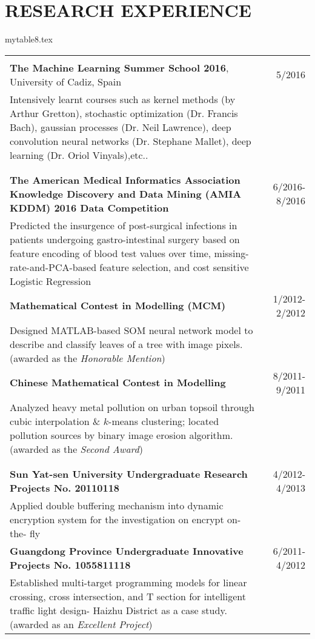 \documentclass[10pt,letterpaper]{article}
\begin{document}
\section*{RESEARCH EXPERIENCE}
\begin{filecontents}{mytable8.tex}
\begin{longtable}{Xr}
\noindent{\it Professional Training}\\
{\bf The Machine Learning Summer School 2016}, University of Cadiz, Spain& 5/2016\\
Intensively learnt courses such as kernel methods (by Arthur Gretton), stochastic optimization (Dr. Francis Bach), gaussian processes (Dr. Neil Lawrence), deep convolution neural networks (Dr. Stephane Mallet), deep learning (Dr. Oriol Vinyals),etc..\\
&\\
\noindent{\it Competitions}\\
\textbf{The American Medical Informatics Association Knowledge Discovery and Data Mining (AMIA KDDM) 2016 Data Competition}&6/2016-8/2016\\
Predicted the insurgence of post-surgical infections in patients undergoing gastro-intestinal surgery based on feature encoding of blood test values over time, missing-rate-and-PCA-based feature selection, and cost sensitive Logistic Regression&\\
\textbf{Mathematical Contest in Modelling (MCM) }& 1/2012-2/2012\\
Designed MATLAB-based SOM neural network model to describe and classify leaves of a tree with image pixels. (awarded as the {\it Honorable Mention})&\\
\textbf{Chinese Mathematical Contest in Modelling}& 8/2011-9/2011\\
Analyzed heavy metal pollution on urban topsoil through cubic interpolation \& $k$-means clustering; located pollution sources by binary image erosion algorithm. (awarded as the {\it Second Award})&\\
&\\
\noindent{\it Student Projects}\\
{\bf Sun Yat-sen University Undergraduate Research Projects No. 20110118}&4/2012-4/2013\\
Applied double buffering mechanism into dynamic encryption system for the investigation on encrypt on- the- fly\\                                                                
\textbf{Guangdong Province Undergraduate Innovative Projects No. 1055811118} & 6/2011-4/2012\\
Established multi-target programming models for linear crossing, cross intersection, and T section for intelligent traffic light design- Haizhu District as a case study. (awarded as an {\it Excellent Project})&\\
\end{longtable}
\end{filecontents}
\end{document}
